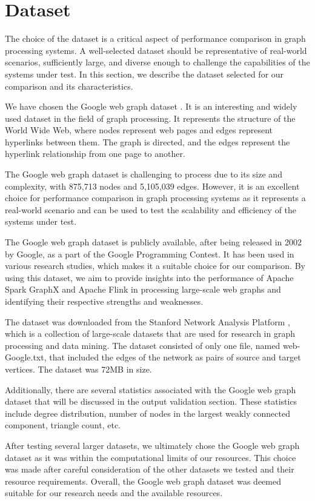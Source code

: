 \documentclass[conference]{IEEEtran}
\begin{document}
\section{\textbf{Dataset}}\label{data}
The choice of the dataset is a critical aspect of performance comparison in graph processing systems. A well-selected dataset should be representative of real-world scenarios, sufficiently large, and diverse enough to challenge the capabilities of the systems under test. In this section, we describe the dataset selected for our comparison and its characteristics.

We have chosen the Google web graph dataset \cite{b5} \cite{b6}. It is an interesting and widely used dataset in the field of graph processing. It represents the structure of the World Wide Web, where nodes represent web pages and edges represent hyperlinks between them. The graph is directed, and the edges represent the hyperlink relationship from one page to another.

The Google web graph dataset is challenging to process due to its size and complexity, with 875,713 nodes and 5,105,039 edges. However, it is an excellent choice for performance comparison in graph processing systems as it represents a real-world scenario and can be used to test the scalability and efficiency of the systems under test.

The Google web graph dataset is publicly available, after being released in 2002 by Google, as a part of the Google Programming Contest. It has been used in various research studies, which makes it a suitable choice for our comparison. By using this dataset, we aim to provide insights into the performance of Apache Spark GraphX and Apache Flink in processing large-scale web graphs and identifying their respective strengths and weaknesses.

The dataset was downloaded from the Stanford Network Analysis Platform \cite{b5}, which is a collection of large-scale datasets that are used for research in graph processing and data mining. The dataset consisted of only one file, named web-Google.txt, that included the edges of the network as pairs of source and target vertices. The dataset was 72MB in size.

Additionally, there are several statistics associated with the Google web graph dataset that will be discussed in the output validation section. These statistics include degree distribution, number of nodes in the largest weakly connected component, triangle count, etc.

After testing several larger datasets, we ultimately chose the Google web graph dataset as it was within the computational limits of our resources. This choice was made after careful consideration of the other datasets we tested and their resource requirements. Overall, the Google web graph dataset was deemed suitable for our research needs and the available resources.
\end{document}
